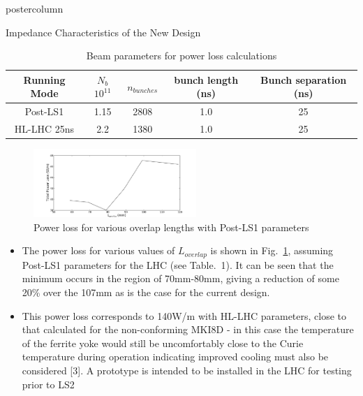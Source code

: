 \documentclass[final,hyperref={pdfpagelabels=false}]{beamer}
\begin{document}
\begin{frame}
\begin{columns}
\begin{column}{.49\textwidth}
\begin{beamercolorbox}[center,wd=\textwidth]{postercolumn}
\begin{minipage}[T]{.95\textwidth}
{\begin{block}{Impedance Characteristics of the New Design}
\begin{table}
\label{tab:beamPar}
\caption*{Beam parameters for power loss calculations}
\begin{center}
\begin{tabular}{c | c | c | c | c}
\small{Running Mode} & $N_{b}$ $10^{11}$ & $n_{bunches}$ & bunch length (ns) & Bunch separation (ns) \\ \hline 
\small{Post-LS1} & 1.15 & 2808 & 1.0 & 25 \\ \hline
\small{HL-LHC 25ns}& 2.2 & 1380 & 1.0 & 25 \\ 
\end{tabular}
\end{center}
\end{table}

\begin{figure}
\includegraphics[width=0.55\textwidth]{heatingOverlapFull.pdf}
\caption{Power loss for various overlap lengths with Post-LS1 parameters}
\label{fig:powLossTotal}
\end{figure}

\begin{itemize}
\item{The power loss for various values of $L_{overlap}$ is shown in Fig.~\ref{fig:powLossTotal}, assuming Post-LS1 parameters for the LHC (see Table.~1). It can be seen that the minimum occurs in the region of 70mm-80mm, giving a reduction of some 20\% over the 107mm as is the case for the current design.}
\item{This power loss corresponds to 140W/m with HL-LHC parameters, close to that calculated for the non-conforming MKI8D - in this case the temperature of the ferrite yoke would still be uncomfortably close to the Curie temperature during operation indicating improved cooling must also be considered [3]. A prototype is intended to be installed in the LHC for testing prior to LS2}
\end{itemize}


\end{block}

}
\end{minipage}
\end{beamercolorbox}
\end{column}
\end{columns}
\end{frame}
\end{document}

